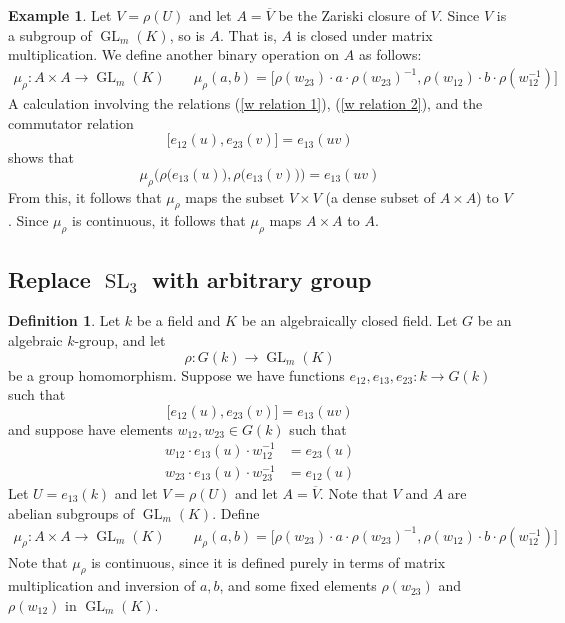 \documentclass[12pt]{article}
\theoremstyle{definition}
\newtheorem{definition}{Definition}
\newtheorem{example}{Example}
\newcommand{\inv}{^{-1}}
\newcommand{\ov}{\overline}
\DeclareMathOperator{\SL}{SL}
\DeclareMathOperator{\GL}{GL}
\begin{document}
\begin{example}
Let $V = \rho(U)$ and let $A = \ov V$ be the Zariski closure of $V$. Since $V$ is a subgroup of $\GL_m(K)$, so is $A$. That is, $A$ is closed under matrix multiplication. We define another binary operation on $A$ as follows:
\begin{align*}
	\mu_\rho:A \times A \to \GL_m(K) \qquad 
	\mu_\rho(a,b) = \Big[ \rho(w_{23}) \cdot a \cdot \rho(w_{23}) \inv, \rho(w_{12}) \cdot b \cdot \rho(w_{12} \inv) \Big]
\end{align*}
A calculation involving the relations (\ref{w relation 1}), (\ref{w relation 2}), and the commutator relation
\[
	\Big[ e_{12}(u),  e_{23}(v) \Big] = e_{13}(uv)
\]
shows that 
\[
	\mu_\rho \Big( \rho \big(e_{13}(u) \big), \rho \big(e_{13}(v) \big) \Big) = e_{13}(uv)
\]
From this, it follows that $\mu_\rho$ maps the subset $V \times V$ (a dense subset of $A \times A$) to $V$. Since $\mu_\rho$ is continuous, it follows that $\mu_\rho$ maps $A \times A$ to $A$.
\end{example}

\newpage

\subsection{Replace $\SL_3$ with arbitrary group}

\begin{definition}
Let $k$ be a field and $K$ be an algebraically closed field. Let $G$ be an algebraic $k$-group, and let
\[
	\rho:G(k) \to \GL_m(K)
\]
be a group homomorphism. Suppose we have functions $e_{12}, e_{13}, e_{23}:k \to G(k)$ such that
\[
	\Big[ e_{12}(u),  e_{23}(v) \Big] = e_{13}(uv)
\]
and suppose have elements $w_{12}, w_{23} \in G(k)$ such that
\begin{align*}
	w_{12} \cdot e_{13}(u) \cdot w_{12} \inv &= e_{23}(u) \\
	w_{23} \cdot e_{13}(u) \cdot w_{23} \inv &= e_{12}(u)
\end{align*}
Let $U = e_{13}(k)$ and let $V = \rho(U)$ and let $A = \ov{V}$. Note that $V$ and $A$ are abelian subgroups of $\GL_m(K)$. Define
\begin{align*}
	\mu_\rho:A \times A \to \GL_m(K) \qquad
	\mu_\rho(a,b) = \Big[ \rho(w_{23}) \cdot a \cdot \rho(w_{23}) \inv, \rho(w_{12}) \cdot b \cdot \rho(w_{12} \inv) \Big]
\end{align*}
Note that $\mu_{\rho}$ is continuous, since it is defined purely in terms of matrix multiplication and inversion of $a, b$, and some fixed elements $\rho(w_{23})$ and $\rho(w_{12})$ in $\GL_m(K)$. 
\end{definition}
\end{document}
